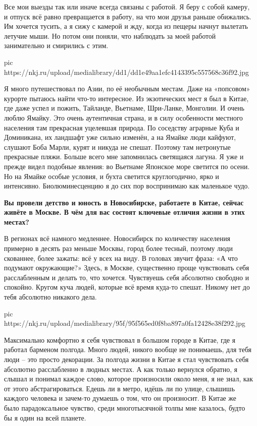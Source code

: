 Все мои выезды так или иначе всегда связаны с работой. Я беру с собой камеру, и
отпуск всё равно превращается в работу, на что мои друзья раньше обижались. Им
хочется тусить, а я сижу с камерой и жду, когда из пещеры начнут вылетать
летучие мыши. Но потом они поняли, что наблюдать за моей работой занимательно и
смирились с этим. 

\ifcmt
pic https://nkj.ru/upload/medialibrary/dd1/dd1e49aa1efc4143395c557568c36f92.jpg
\fi

Я много путешествовал по Азии, по её необычным местам. Даже на «попсовом»
курорте пытаюсь найти что-то интересное. Из экзотических мест я был в Китае,
где даже успел и пожить, Тайланде, Вьетнаме, Шри-Ланке, Монголии. И очень
люблю Ямайку. Это очень аутентичная страна, и в силу особенности местного
населения там прекрасная уцелевшая природа. По соседству аграрные Куба и
Доминикана, их ландшафт уже сильно изменён, а на Ямайке люди кайфуют, слушают
Боба Марли, курят и никуда не спешат. Поэтому там нетронутые прекрасные пляжи.
Больше всего мне запомнилась светящаяся лагуна. Я уже и прежде видел подобные
явления: во Вьетнаме Японское море светится по осени. Но на Ямайке особые
условия, и бухта светится круглогодично, ярко и интенсивно. Биолюминесценцию я
до сих пор воспринимаю как маленькое чудо.

\textbf{Вы провели детство и юность в Новосибирске, работаете в Китае, сейчас живёте в
Москве. В чём для вас состоят ключевые отличия жизни в этих местах?}

В регионах всё намного медленнее. Новосибирск по количеству населения примерно
в десять раз меньше Москвы, город более тесный, поэтому люди скованнее, более
зажаты: всё у всех на виду. В головах звучит фраза: «А что подумают
окружающие?» Здесь, в Москве, существенно проще чувствовать себя расслабленным
и делать то, что хочется. Чувствуешь себя абсолютно свободно и спокойно. Кругом
куча людей, которые всё время куда-то спешат. Никому нет до тебя абсолютно
никакого дела. 

\ifcmt
pic https://nkj.ru/upload/medialibrary/95f/95f565ed0f8ba897a0fa12428e38f292.jpg
\fi

Максимально комфортно я себя чувствовал в большом городе в Китае, где я
работал барменом полгода. Много людей, никого вообще не понимаешь, для тебя
люди – это просто декорации. За полгода жизни в Китае я стал чувствовать себя
абсолютно расслабленно в людных местах. А как только вернулся обратно, я
слышал и понимал каждое слово, которое произносили около меня, я не знал, как
от этого абстрагироваться. Едешь ли в метро, идёшь ли по улице, слышишь
каждого человека и зачем-то думаешь о том, что он произносит. В Китае же было
парадоксальное чувство, среди многотысячной толпы мне казалось, будто бы я
один на всей планете.

